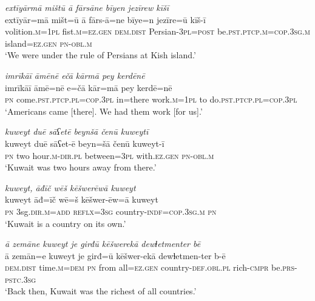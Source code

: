 \ea \label{ŽM.38}
\textit{extīyārmā mištū ā fārsāne bīyen jezīrew kīšī} \\ 
\gll extīyār=mā mišt=ū ā fārs-ā=ne bīye=n jezīre=ū kīš-ī \\ 
 volition\textsc{.m}\textsc{=\textsc{1pl}} fist\textsc{.m}\textsc{=ez.gen} \textsc{dem.dist} Persian\textsc{-3pl}\textsc{=\textsc{post}} be\textsc{.pst}\textsc{.ptcp}\textsc{.m}\textsc{=cop}\textsc{.3sg}\textsc{.m} island\textsc{=ez.gen} \textsc{pn}\textsc{-obl}\textsc{.m} \\ 
\glt `We were under the rule of Persians at Kish island.'
\z 
 
\ea \label{ŽM.39}
\textit{imrīkāī āmēnē ečā kārmā pey kerdēnē} \\ 
\gll imrīkāī āmē=nē e=čā kār=mā pey kerdē=nē \\ 
 \textsc{pn} come\textsc{.pst}\textsc{.ptcp}\textsc{.pl}\textsc{=cop}\textsc{.3pl} in=there work\textsc{.m}\textsc{=\textsc{1pl}} to do\textsc{.pst}\textsc{.ptcp}\textsc{.pl}\textsc{=cop}\textsc{.3pl} \\ 
\glt `Americans came [there]. We had them work [for us].'
\z 
 
\ea \label{ŽM.41}
\textit{kuweyt duē sāʕetē beynšā čenū kuweytī} \\ 
\gll kuweyt duē sāʕet-ē beyn=šā čenū kuweyt-ī \\ 
 \textsc{pn} two hour\textsc{.m}\textsc{-dir}\textsc{.pl} between\textsc{=3pl} with\textsc{\textsc{.ez}.gen} \textsc{pn}\textsc{-obl}\textsc{.m} \\ 
\glt `Kuwait was two hours away from there.'
\z 
 
\ea \label{ŽM.42}
\textit{kuweyt, āđīč wēš kēšwerēwā kuweyt} \\ 
\gll kuweyt āđ=īč wē=š kēšwer-ēw=ā kuweyt \\ 
 \textsc{pn} 3sg\textsc{.dir}\textsc{.m}\textsc{=add} \textsc{reflx}\textsc{=3sg} country\textsc{-indf}\textsc{=cop}\textsc{.3sg}\textsc{.m} \textsc{pn} \\ 
\glt `Kuwait is a country on its own.'
\z 
 
\ea \label{ŽM.43}
\textit{ā zemāne kuweyt je girđū kēšwerekā dewɫetmenter bē} \\ 
\gll ā zemān=e kuweyt je girđ=ū kēšwer-ekā dewɫetmen-ter b-ē \\ 
 \textsc{dem.dist} time\textsc{.m}\textsc{=dem} \textsc{pn} from all\textsc{=ez.gen} country\textsc{-def}\textsc{.obl}\textsc{.pl} rich\textsc{-cmpr} be\textsc{.prs}\textsc{-pstc}\textsc{.3sg} \\ 
\glt `Back then, Kuwait was the richest of all countries.'
\z 
 
